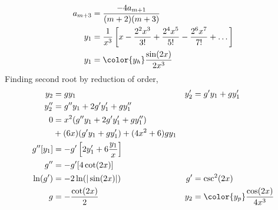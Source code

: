 \begin{enumerate}
\begin{align}
              a_{m+3} & = \frac{-4a_{m+1}}{(m+2)(m+3)}                \\
              y_1     & =  \frac{1}{x^3} \left[ x - \frac{2^2x^3}{3!}
              + \frac{2^4x^5}{5!} - \frac{2^6x^7}{7!} + \dots \right] \\
              y_1     & = \color{y_h} \frac{\sin(2x)}{2x^3}
          \end{align}
          Finding second root by reduction of order,
          \begin{align}
              y_2      & = gy_1                                      &
              y_2'     & = g'y_1 + gy_1'                               \\
              y_2''    & = g''y_1 + 2g'y_1' + gy_1''                   \\
              0        & = x^2(g''y_1 + 2g'y_1' + gy_1'')              \\
                       & + (6x)(g'y_1 + gy_1') + (4x^2 + 6)gy_1        \\
              g''[y_1] & = -g' \left[ 2y_1' + 6\frac{y_1}{x} \right]   \\
              g''      & = -g' [4\cot(2x)]                             \\
              \ln(g')  & = -2\ln(|\sin(2x)|)                         &
              g'       & = \csc^2(2x)                                  \\
              g        & = -\frac{\cot(2x)}{2}                       &
              y_2      & = \color{y_p} \frac{\cos(2x)}{4x^3}
          \end{align}


\end{enumerate}
